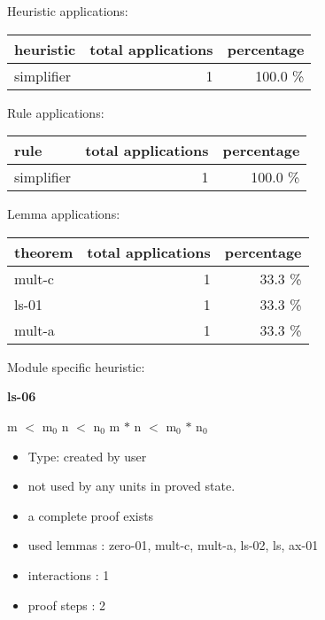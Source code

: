 \documentclass[a4paper]{article}
\begin{document}
\medskip


Heuristic applications:

\begin{supertabular}{l|r|r}
heuristic	& total applications & percentage \\ \hline
simplifier & 1 & 100.0 \% \\

\end{supertabular}

Rule applications:

\begin{supertabular}{l|r|r}
rule	        & total applications & percentage \\ \hline
simplifier & 1 & 100.0 \% \\

\end{supertabular}

Lemma applications:

\begin{supertabular}{l|r|r}
theorem	        & total applications & percentage \\ \hline
mult-c & 1 & 33.3 \% \\
ls-01 & 1 & 33.3 \% \\
mult-a & 1 & 33.3 \% \\

\end{supertabular}

Module specific heuristic:

\pagebreak

{\LARGE\bf ls-06}\label{lemma-ls-06}

\medskip

 \Fol m $<$ $\mbox{m}_{0}$ \And n $<$ $\mbox{n}_{0}$ \Imp m $*$ n $<$ $\mbox{m}_{0}$ $*$ $\mbox{n}_{0}$

\begin{itemize}

\item Type: created by user

\item not used by any units in proved state.
\item       a complete proof exists
\item       used lemmas  : zero-01, mult-c, mult-a, ls-02, ls, ax-01
\item       interactions : 1
\item       proof steps  : 2
\end{itemize}

\medskip
\end{document}
